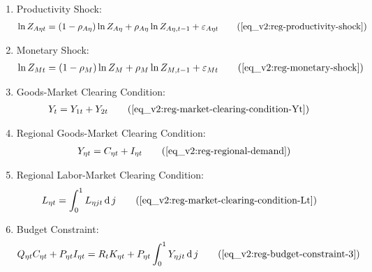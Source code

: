 \documentclass[../thesis.tex]{subfiles}
\begin{document}
{\begin{itemize}
\begin{enumerate}
		\item Productivity Shock:
		\begin{align}
			\ln{Z_{A\eta t}} = (1-\rho_{A\eta})\ln{Z_{A\eta}} + \rho_{A\eta}\ln{Z_{A\eta,t-1}} + \varepsilon_{A\eta t} \tag{\ref{eq_v2:reg-productivity-shock}}
		\end{align}
		
		\item Monetary Shock:
		\begin{align}
			\ln{Z_{Mt}} = (1-\rho_M)\ln{Z_{M}} + \rho_M\ln{Z_{M,t-1}} + \varepsilon_{Mt} \tag{\ref{eq_v2:reg-monetary-shock}}
		\end{align}

		\item Goods-Market Clearing Condition:
		\begin{align}
			Y_{t} &= Y_{1 t} + Y_{2 t} \tag{\ref{eq_v2:reg-market-clearing-condition-Yt}}
		\end{align}

		\item Regional Goods-Market Clearing Condition:
		\begin{align}
			Y_{\eta t} = C_{\eta t} + I_{\eta t} \tag{\ref{eq_v2:reg-regional-demand}}
		\end{align}
		
		\item Regional Labor-Market Clearing Condition:
		\begin{align}
			L_{\eta t} &= \int_{0}^{1} L_{\eta jt} \dif j \tag{\ref{eq_v2:reg-market-clearing-condition-Lt}}
		\end{align}

		\item Budget Constraint:
		\begin{align}
			Q_{\eta t} C_{\eta t} + P_{\eta t} I_{\eta t} = R_{t} K_{\eta t} + P_{\eta t} \int_{0}^{1} Y_{\eta jt} \dif j \tag{\ref{eq_v2:reg-budget-constraint-3}}
		\end{align}
						
		\end{enumerate}
		
	\end{itemize}
	
} %
\end{document}
